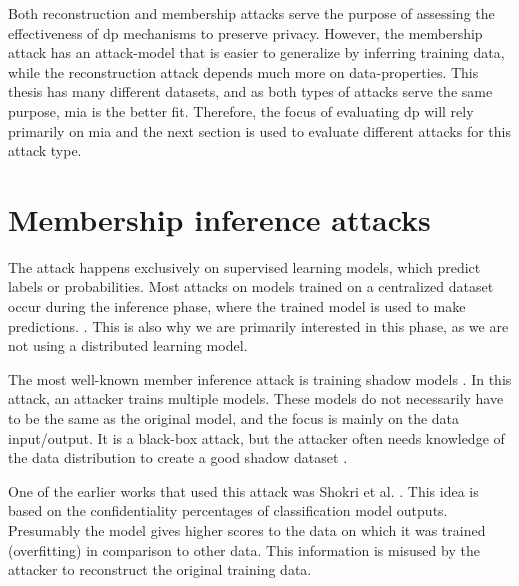 Both reconstruction and membership attacks serve the purpose of assessing the effectiveness of \gls{dp} mechanisms to preserve privacy.
However, the membership attack has an attack-model that is easier to generalize by inferring training data, while the reconstruction attack depends much more on data-properties.
This thesis has many different datasets, and as both types of attacks serve the same purpose, \gls{mia} is the better fit. \newline
Therefore, the focus of evaluating \gls{dp} will rely primarily on \gls{mia} and the next section is used to evaluate different attacks for this attack type.


\section{Membership inference attacks}
The attack happens exclusively on supervised learning models, which predict labels or probabilities.
Most attacks on models trained on a centralized dataset occur during the inference phase, where the trained model is used to make predictions. \citep{rigaki_survey_2021}.
This is also why we are primarily interested in this phase, as we are not using a distributed learning model.

The most well-known member inference attack is training shadow models \citep{rigaki_survey_2021}.
In this attack, an attacker trains multiple models.
These models do not necessarily have to be the same as the original model, and the focus is mainly on the data input/output.
It is a black-box attack, but the attacker often needs knowledge of the data distribution to create a good shadow dataset \citep{rigaki_survey_2021}.

One of the earlier works that used this attack was Shokri et al. \citep{shokri_membership_2017}.
This idea is based on the confidentiality percentages of classification model outputs. Presumably the model gives higher scores to the data on which it was trained (overfitting) in comparison to other data. This information is misused by the attacker to reconstruct the original training data.

